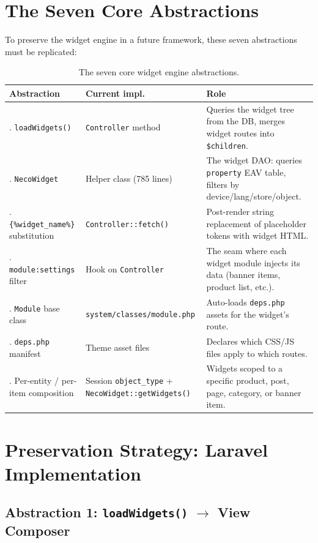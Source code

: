\documentclass[11pt,a4paper]{article}
\begin{document}
\section{The Seven Core Abstractions}\label{sec:seven-abstractions}

To preserve the widget engine in a future framework, these seven
abstractions must be replicated:

\begin{table}[htbp]
\centering
\caption{The seven core widget engine abstractions.}\label{tab:seven}
\footnotesize\sloppy
\begin{tabularx}{\columnwidth}{>{\raggedright\arraybackslash}p{3.5cm}lX}
\toprule
\textbf{Abstraction} & \textbf{Current impl.} & \textbf{Role} \\
\midrule
1. \texttt{loadWidgets()} & \texttt{Controller} method & Queries the widget tree from the DB, merges widget routes into \texttt{\$children}. \\
2. \texttt{NecoWidget} & Helper class (785 lines) & The widget DAO: queries \texttt{property} EAV table, filters by device/lang/store/object. \\
3. \texttt{\{\%widget\_name\%\}} substitution & \texttt{Controller::fetch()} & Post-render string replacement of placeholder tokens with widget HTML. \\
4. \texttt{module:settings} filter & Hook on \texttt{Controller} & The seam where each widget module injects its data (banner items, product list, etc.). \\
5. \texttt{Module} base class & \texttt{system/classes/module.php} & Auto-loads \texttt{deps.php} assets for the widget's route. \\
6. \texttt{deps.php} manifest & Theme asset files & Declares which CSS/JS files apply to which routes. \\
7. Per-entity / per-item composition & Session \texttt{object\_type} + \texttt{NecoWidget::getWidgets()} & Widgets scoped to a specific product, post, page, category, or banner item. \\
\bottomrule
\end{tabularx}
\end{table}

\section{Preservation Strategy: Laravel Implementation}\label{sec:laravel-preservation}

\subsection{Abstraction 1: \texttt{loadWidgets()} $\to$ View Composer}
\end{document}

